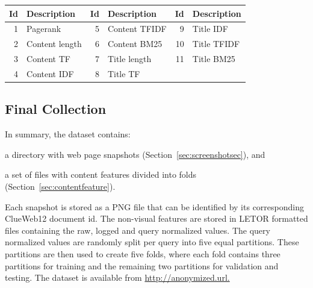 \begin{table}[h]
\centering
{}  \label{tab:setdescription} 
\begin{tabular}{rlrlrl}
\toprule
Id & Description & Id & Description & Id & Description    \\ 
\midrule
1  & Pagerank  & 5  & Content TFIDF  & 9  & Title IDF   \\
2  & Content length & 6  & Content BM25   & 10 & Title TFIDF   \\
3  & Content TF  & 7  & Title length & 11 & Title BM25  \\
4  & Content IDF & 8  & Title TF  & & \\
\bottomrule
\end{tabular}
\end{table}

\subsection{Final Collection}\label{sec:finalcollection}
In summary, the \datasetname{} dataset contains:
\begin{inparaenum}[(i)]
\item a directory with web page snapshots (Section~\ref{sec:screenshotsec}), and
\item a set of files with content features divided into folds (Section~\ref{sec:contentfeature}).
\end{inparaenum}
Each snapshot is stored as a PNG file that can be identified by its corresponding ClueWeb12 document id. 
The non-visual features are stored in LETOR formatted files containing the raw, logged and query normalized values.
The query normalized values are randomly split per query into five equal partitions.
These partitions are then used to create five folds, where each fold contains three partitions for training and the remaining two partitions for validation and testing.
The \datasetname{} dataset is available from \url{http://anonymized.url.}


